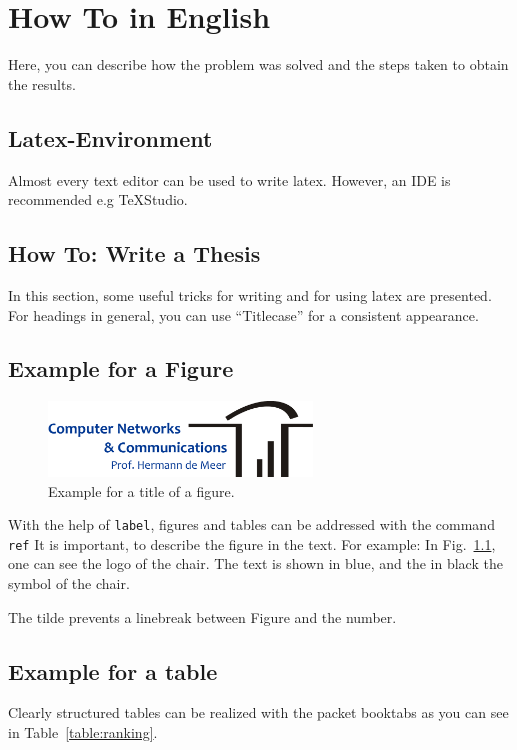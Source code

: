 \chapter{How To in English}
Here, you can describe how the problem was solved and the steps taken to obtain the results.

\section{Latex-Environment}
Almost every text editor can be used to write latex. However, an IDE is recommended e.g TeXStudio.


\section{How To: Write a Thesis}
In this section, some useful tricks for writing and for using latex are presented.
For headings in general, you can use ``Titlecase'' for a consistent appearance.

\section{Example for a Figure}
	\begin{figure}[h!]
		\begin{center}
			\includegraphics[width=7cm]{img/logochair.pdf}
			\caption{Example for a title of a figure.}
			\label{fig:ToUseWithReference}
		\end{center}
	\end{figure}
	
	With the help of \texttt{\bslash label}, figures and tables can be addressed with the command \texttt{\bslash ref} 
	It is important, to describe the figure in the text. For example: In Fig.~\ref{fig:ToUseWithReference}, one can see the logo of the chair. The text is shown in blue, and the in black the symbol of the chair.
	
	The tilde prevents a linebreak between Figure and the number.
	
	\section{Example for a table}
	Clearly structured tables can be realized with the packet booktabs as you can see in Table~\ref{table:ranking}.
	
